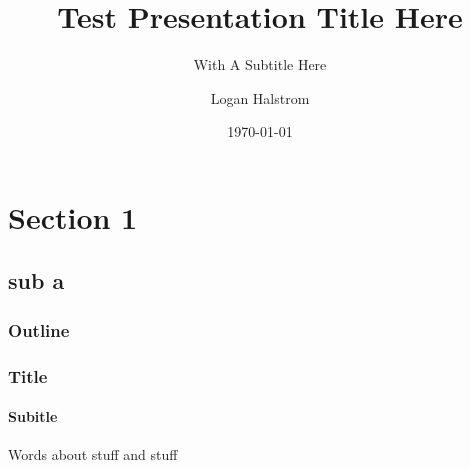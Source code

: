 \documentclass{beamer}
\title{Test Presentation Title Here}
\subtitle{With A Subtitle Here}
\author{Logan Halstrom}
\institute{UCD + NASA}
\date{\today}
\begin{document}

\begin{frame}
\titlepage
\end{frame}


\section{Section 1}
\subsection{sub a}

\begin{frame}
\frametitle{Outline}
\tableofcontents
\end{frame}


\begin{frame}
\frametitle{Title}
\framesubtitle{Subitle}
Words about stuff and stuff
\end{frame}
\end{document}
